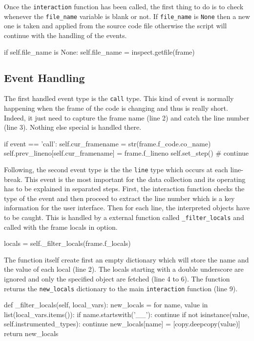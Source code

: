 Once the \texttt{interaction} function has been called, the first thing to do is to check whenever the \texttt{file\_name} variable is blank or not. If \texttt{file\_name} is \texttt{None} then a new one is taken and applied from the source code file otherwise the script will continue with the handling of the events.
\begin{python}
if self.file_name is None:
    self.file_name = inspect.getfile(frame)
\end{python}

\subsection{Event Handling}
The first handled event type is the \texttt{call} type. This kind of event is normally happening when the frame of the code is changing and thus is really short. Indeed, it just need to capture the frame name (line 2) and catch the line number (line 3). Nothing else special is handled there.
\begin{python}
if event == 'call':
    self.cur_framename = str(frame.f_code.co_name)
    self.prev_lineno[self.cur_framename] = frame.f_lineno
    self.set_step() # continue
\end{python}

Following, the second event type is the the \texttt{line} type which occurs at each line-break. This event is the most important for the data collection and its operating has to be explained in separated steps. First, the interaction function checks the type of the event and then proceed to extract the line number which is a key information for the user interface. Then for each line, the interpreted objects have to be caught. This is handled by a external function called \texttt{\_filter\_locals} and called with the frame locals in option.
\begin{python}
locals = self._filter_locals(frame.f_locals)
\end{python}

The function itself create first an empty dictionary which will store the name and the value of each local (line 2). The locals starting with a double underscore are ignored and only the specified object are fetched (line 4 to 6). The function returns the \texttt{new\_locals} dictionary to the main \texttt{interaction} function (line 9).

\begin{python}
def _filter_locals(self, local_vars):
    new_locals = {}
    for name, value in list(local_vars.items()):
        if name.startswith('__'):
            continue
        if not isinstance(value, self.instrumented_types):
            continue
        new_locals[name] = [copy.deepcopy(value)]
    return new_locals

\end{python}

